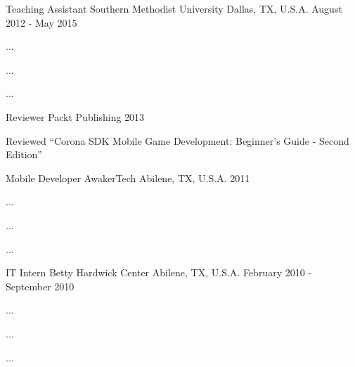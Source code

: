 

\begin{cventries}

  \cventry
    {Teaching Assistant} %
    {Southern Methodist University} %
    {Dallas, TX, U.S.A.} %
    {August 2012 - May 2015} %
    {
      \begin{cvitems} %
        \item {...}
        \item {...}
        \item {...}
      \end{cvitems}
    }

  \cventry
    {Reviewer} %
    {Packt Publishing} %
    {} %
    {2013} %
    {
      \begin{cvitems} %
        \item {Reviewed ``Corona SDK Mobile Game Development: Beginner's Guide - Second Edition''}
      \end{cvitems}
    }

  \cventry
    {Mobile Developer} %
    {AwakerTech} %
    {Abilene, TX, U.S.A.} %
    {2011} %
    {
      \begin{cvitems} %
        \item {...}
        \item {...}
        \item {...}
      \end{cvitems}
    }

  \cventry
    {IT Intern} %
    {Betty Hardwick Center} %
    {Abilene, TX, U.S.A.} %
    {February 2010 - September 2010} %
    {
      \begin{cvitems} %
        \item {...}
        \item {...}
        \item {...}
      \end{cvitems}
    }


\end{cventries}
